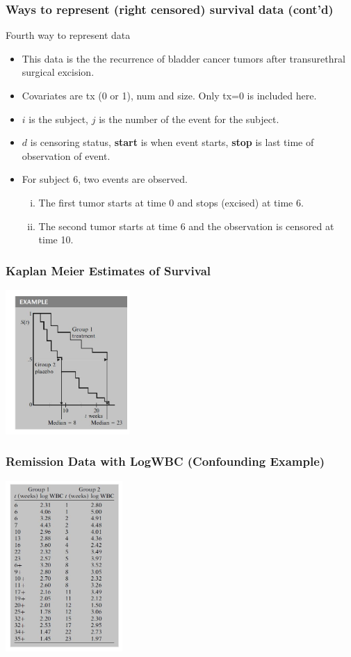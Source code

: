 \documentclass{beamer}
\theoremstyle{definition}
\begin{document}
\begin{frame}
\frametitle{Ways to represent (right censored) survival data (cont'd)}
\begin{block}{Fourth way to represent data }
\begin{itemize}
\item This data is the the recurrence of bladder cancer tumors after transurethral surgical excision.
\item Covariates are tx (0 or 1), num and size. Only tx=0 is included here.
\item $i$ is the subject, $j$ is the number of the event for the subject.
\item $d$ is censoring status, \textbf{start} is when event starts, \textbf{stop} is last time of observation of event.
\item For subject 6, two events are observed.
\begin{enumerate}[i.]
\item The first tumor starts at time 0 and stops (excised) at time 6.
\item The second tumor starts at time 6 and the observation is censored at time 10.
\end{enumerate}
\end{itemize}
\end{block}
\end{frame}

\begin{frame}
\frametitle{Kaplan Meier Estimates of Survival}
 \includegraphics[width =\textwidth, height=5.5cm]{Ch1_estsurv.JPG}
 \end{frame}

\begin{frame}
\frametitle{Remission Data with LogWBC (Confounding Example)}
 \includegraphics[width =\textwidth, height=6.5cm]{Ch1-RemissionwLogwbc.JPG}
 \end{frame}
\end{document}
